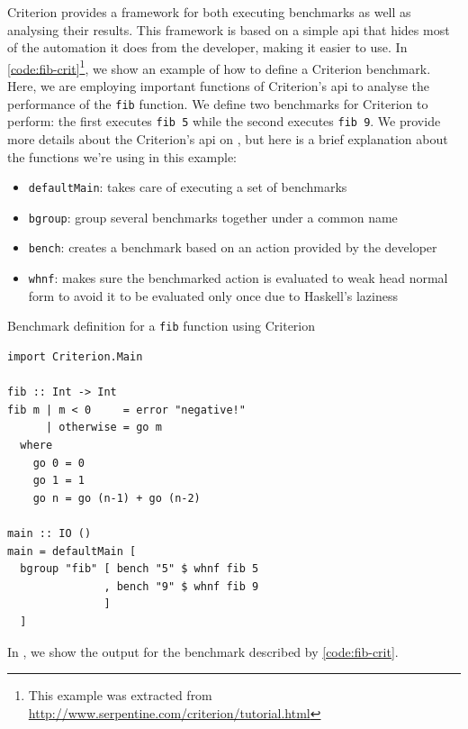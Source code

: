Criterion provides a framework for both executing benchmarks as well as analysing their results. This framework is based on a simple \ac{api} that hides most of the automation it does from the developer, making it easier to use. In \autoref{code:fib-crit}\footnote{This example was extracted from \url{http://www.serpentine.com/criterion/tutorial.html}}, we show an example of how to define a Criterion benchmark. Here, we are employing important functions of Criterion's \ac{api} to analyse the performance of the \texttt{fib} function. We define two benchmarks for Criterion to perform: the first executes \texttt{fib 5} while the second executes \texttt{fib 9}. We provide more details about the Criterion's \ac{api} on , but here is a brief explanation about the functions we're using in this example:
\begin{itemize}
  \item \texttt{defaultMain}: takes care of executing a set of benchmarks
  \item \texttt{bgroup}: group several benchmarks together under a common name
  \item \texttt{bench}: creates a benchmark based on an action provided by the developer
  \item \texttt{whnf}: makes sure the benchmarked action is evaluated to weak head normal form to avoid it to be evaluated only once due to Haskell's laziness
\end{itemize}

\begin{listing}
  \caption{Benchmark definition for a \texttt{fib} function using Criterion}
  \begin{verbatim}
import Criterion.Main

fib :: Int -> Int
fib m | m < 0     = error "negative!"
      | otherwise = go m
  where
    go 0 = 0
    go 1 = 1
    go n = go (n-1) + go (n-2)

main :: IO ()
main = defaultMain [
  bgroup "fib" [ bench "5" $ whnf fib 5
               , bench "9" $ whnf fib 9
               ]
  ]
  \end{verbatim}
  \label{code:fib-crit}
\end{listing}

In , we show the output for the benchmark described by \autoref{code:fib-crit}.

